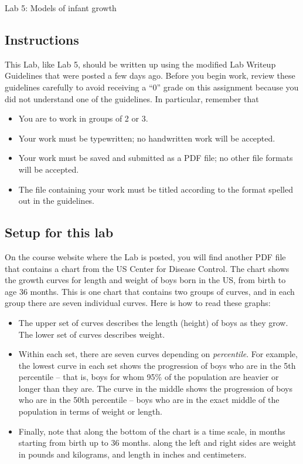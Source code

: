 \documentclass[11pt,letterpaper]{article}
\begin{document}
\begin{flushright}
	\begin{Large}
		Lab 5: Models of infant growth
	\end{Large}
\end{flushright}

\subsection*{Instructions} 

This Lab, like Lab 5, should be written up using the modified Lab Writeup Guidelines that were posted a few days ago. Before you begin work, review these guidelines carefully to avoid receiving a ``0'' grade on this assignment because you did not understand one of the guidelines. In particular, remember that 

\begin{itemize}
	\item You are to work in groups of 2 or 3. 
	\item Your work must be typewritten; no handwritten work will be accepted. 
	\item Your work must be saved and submitted as a PDF file; no other file formats will be accepted. 
	\item The file containing your work must be titled according to the format spelled out in the guidelines. 
\end{itemize}


\subsection*{Setup for this lab}

On the course website where the Lab is posted, you will find another PDF file that contains a chart from the US Center for Disease Control. The chart shows the growth curves for length and weight of boys born in the US, from birth to age 36 months. This is one chart that contains two groups of curves, and in each group there are seven individual curves. Here is how to read these graphs: 

\begin{itemize}
	\item The upper set of curves describes the length (height) of boys as they grow. The lower set of curves describes weight. 
	\item Within each set, there are seven curves depending on \emph{percentile}. For example, the lowest curve in each set shows the progression of boys who are in the 5th percentile -- that is, boys for whom 95\% of the population are heavier or longer than they are. The curve in the middle shows the progression of boys who are in the 50th percentile -- boys who are in the exact middle of the population in terms of weight or length. 
	\item Finally, note that along the bottom of the chart is a time scale, in months starting from birth up to 36 months. along the left and right sides are weight in pounds and kilograms, and length in inches and centimeters. 
\end{itemize}
\end{document}
